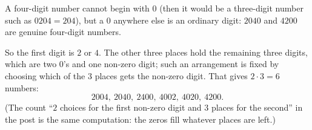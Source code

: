 A four-digit number cannot begin with $0$ (then it would be a three-digit number such as $0204=204$), but a $0$ anywhere else is an ordinary digit: $2040$ and $4200$ are genuine four-digit numbers.

So the first digit is $2$ or $4$. The other three places hold the remaining three digits, which are two $0$'s and one non-zero digit; such an arrangement is fixed by choosing which of the $3$ places gets the non-zero digit. That gives $2\cdot3=\boxed{6}$ numbers:
\[
2004,\ 2040,\ 2400,\ 4002,\ 4020,\ 4200 .
\]
(The count ``$2$ choices for the first non-zero digit and $3$ places for the second'' in the post is the same computation: the zeros fill whatever places are left.)
